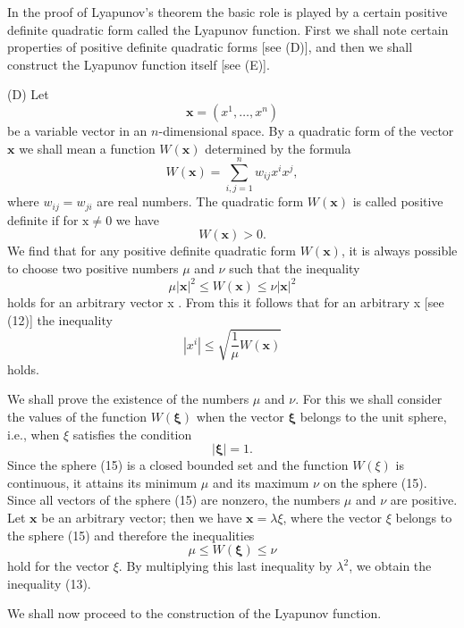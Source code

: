 \documentclass[10pt,a5paper]{book}
\theoremstyle{plain}
\theoremstyle{definition}
\theoremstyle{remark}
\begin{document}
In the proof of Lyapunov's theorem the basic role is played by a certain positive definite quadratic form called the Lyapunov function. First we shall note certain properties of positive definite quadratic forms [see (D)], and then we shall construct the Lyapunov function itself [see (E)].

(D) Let
\begin{equation*}
\mathbf{x}=\left(x^{1}, \ldots, x^{n}\right) \tag{12}
\end{equation*}
be a variable vector in an $n$-dimensional space. By a quadratic form of the vector $\mathbf{x}$ we shall mean a function $W(\mathbf{x})$ determined by the formula
\[
W(\mathbf{x})=\sum_{i, j=1}^{n} w_{i j} x^{i} x^{j},
\]
where $w_{i j}=w_{j i}$ are real numbers. The quadratic form $W(\mathbf{x})$ is called
positive definite if for $\mathrm{x} \neq 0$ we have
\[
W(\mathbf{x})>0 .
\]
We find that for any positive definite quadratic form $W(\mathbf{x})$, it is always possible to choose two positive numbers $\mu$ and $\nu$ such that the inequality
\begin{equation*}
\mu|\mathbf{x}|^{2} \leq W(\mathbf{x}) \leq \nu|\mathbf{x}|^{2} \tag{13}
\end{equation*}
holds for an arbitrary vector x . From this it follows that for an arbitrary x [see (12)] the inequality
\begin{equation*}
\left|x^{i}\right| \leq \sqrt{\frac{1}{\mu} W(\mathbf{x})} \tag{14}
\end{equation*}
holds.

We shall prove the existence of the numbers $\mu$ and $\nu$. For this we shall consider the values of the function $W(\boldsymbol{\xi})$ when the vector $\boldsymbol{\xi}$ belongs to the unit sphere, i.e., when $\xi$ satisfies the condition
\begin{equation*}
|\boldsymbol{\xi}|=1 . \tag{15}
\end{equation*}
Since the sphere (15) is a closed bounded set and the function $W(\xi)$ is continuous, it attains its minimum $\mu$ and its maximum $\nu$ on the sphere (15). Since all vectors of the sphere (15) are nonzero, the numbers $\mu$ and $\nu$ are positive. Let $\mathbf{x}$ be an arbitrary vector; then we have $\mathbf{x}=\lambda \xi$, where the vector $\xi$ belongs to the sphere (15) and therefore the inequalities
\[
\mu \leq W(\boldsymbol{\xi}) \leq \nu
\]
hold for the vector $\xi$. By multiplying this last inequality by $\lambda^{2}$, we obtain the inequality (13).

We shall now proceed to the construction of the Lyapunov function.
\end{document}
